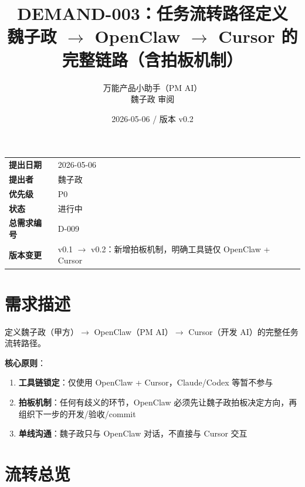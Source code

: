 \documentclass[11pt,a4paper]{article}
\title{\textbf{DEMAND-003：任务流转路径定义}\\[0.5em]\small 魏子政 $\to$ OpenClaw $\to$ Cursor 的完整链路（含拍板机制）}
\author{万能产品小助手（PM AI）\\魏子政 审阅}
\date{2026-05-06 / 版本 v0.2}
\begin{document}
\maketitle

\begin{center}
\begin{tabular}{>{\bfseries}p{3cm} p{10cm}}
\toprule
提出日期 & 2026-05-06 \\
提出者 & 魏子政 \\
优先级 & \textcolor{danger}{P0} \\
状态 & \textcolor{progress}{进行中} \\
总需求编号 & D-009 \\
版本变更 & v0.1 $\to$ v0.2：新增拍板机制，明确工具链仅 OpenClaw + Cursor \\
\bottomrule
\end{tabular}
\end{center}

\vspace{1em}

\section{需求描述}

定义魏子政（甲方）$\to$ OpenClaw（PM AI）$\to$ Cursor（开发 AI）的完整任务流转路径。

\textbf{核心原则}：
\begin{enumerate}[nosep]
  \item \textbf{工具链锁定}：仅使用 OpenClaw + Cursor，Claude/Codex 等暂不参与
  \item \textbf{拍板机制}：任何有歧义的环节，OpenClaw 必须先让魏子政拍板决定方向，再组织下一步的开发/验收/commit
  \item \textbf{单线沟通}：魏子政只与 OpenClaw 对话，不直接与 Cursor 交互
\end{enumerate}

\section{流转总览}
\end{document}

